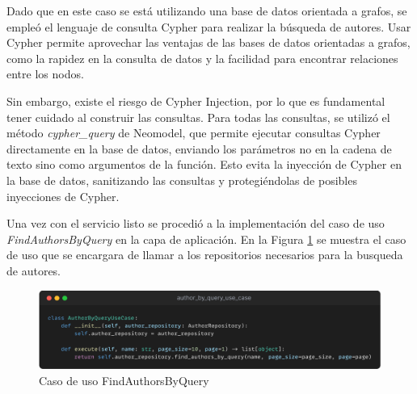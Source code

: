 Dado que en este caso se está utilizando una base de datos orientada a grafos,
se empleó el lenguaje de consulta Cypher para realizar la búsqueda de autores.
Usar Cypher permite aprovechar las ventajas de las bases de datos orientadas a grafos,
como la rapidez en la consulta de datos y la facilidad para encontrar relaciones entre los nodos.

Sin embargo, existe el riesgo de Cypher Injection, por lo que es fundamental tener
cuidado al construir las consultas. Para todas las consultas,
se utilizó el método \textit{cypher\_query} de Neomodel, que permite ejecutar consultas Cypher directamente en la base de datos,
enviando los parámetros no en la cadena de texto sino como argumentos de la función.
Esto evita la inyección de Cypher en la base de datos,
sanitizando las consultas y protegiéndolas de posibles inyecciones de Cypher.

Una vez con el servicio listo se procedió a la implementación del caso de uso \textit{FindAuthorsByQuery} en la capa de aplicación.
En la Figura \ref{fig:find-authors-by-query} se muestra el caso de uso que se encargara de llamar a los repositorios necesarios para la busqueda de autores.

\begin{figure}[H]
    \centering
    \includegraphics[scale=0.11]{../02Figures/02Chapter/Sprints/Sprint-3/author-by-query-use-case.png}
    \caption{Caso de uso FindAuthorsByQuery}
    \label{fig:find-authors-by-query}
\end{figure}

